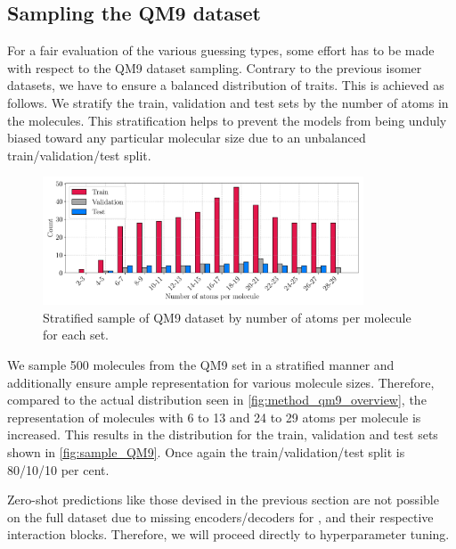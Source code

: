 \subsection{Sampling the QM9 dataset}
\label{sec:qm9_full_isomers_sampling}
For a fair evaluation of the various guessing types, some effort has to be made with respect to the QM9 dataset sampling. Contrary to the previous isomer datasets, we have to ensure a balanced distribution of traits. This is achieved as follows. We stratify the train, validation and test sets by the number of atoms in the molecules. This stratification helps to prevent the models from being unduly biased toward any particular molecular size due to an unbalanced train/validation/test split.
\begin{figure}[H]
    \centering
    \includegraphics[width=0.85\textwidth]{../fig/application/strat_sample.pdf}
    \caption[Stratified sample of QM9 dataset]{Stratified sample of QM9 dataset by number of atoms per molecule for each set.}
    \label{fig:sample_QM9}
\end{figure}
We sample 500 molecules from the QM9 set in a stratified manner and additionally ensure ample representation for various molecule sizes. Therefore, compared to the actual distribution seen in \autoref{fig:method_qm9_overview}, the representation of molecules with 6 to 13 and 24 to 29 atoms per molecule is increased. This results in the distribution for the train, validation and test sets shown in \autoref{fig:sample_QM9}. Once again the train/validation/test split is 80/10/10 per cent. %

Zero-shot predictions like those devised in the previous section are not possible on the full dataset due to missing encoders/decoders for ,  and their respective interaction blocks. Therefore, we will proceed directly to hyperparameter tuning. 
